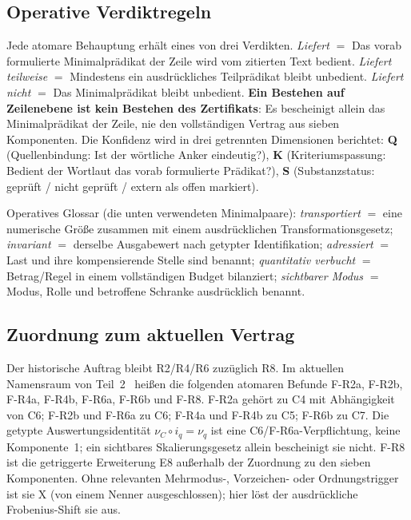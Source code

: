 \documentclass[11pt,a4paper]{article}
\begin{document}
\subsection{Operative Verdiktregeln}\label{sec:rules}

Jede atomare Behauptung erhält eines von drei Verdikten. \emph{Liefert} $=$ Das
vorab formulierte Minimalprädikat der Zeile wird vom zitierten Text bedient.
\emph{Liefert teilweise} $=$ Mindestens ein ausdrückliches Teilprädikat bleibt
unbedient. \emph{Liefert nicht} $=$ Das Minimalprädikat bleibt unbedient.
\textbf{Ein Bestehen auf Zeilenebene ist kein Bestehen des Zertifikats}: Es
bescheinigt allein das Minimalprädikat der Zeile, nie den vollständigen Vertrag
aus sieben Komponenten. Die Konfidenz wird in drei getrennten Dimensionen
berichtet: \textbf{Q} (Quellenbindung: Ist der wörtliche Anker eindeutig?),
\textbf{K} (Kriteriumspassung: Bedient der Wortlaut das vorab formulierte
Prädikat?), \textbf{S} (Substanzstatus: geprüft / nicht geprüft / extern als
offen markiert).

Operatives Glossar (die unten verwendeten Minimalpaare):
\emph{transportiert} $=$ eine numerische Größe zusammen mit einem
ausdrücklichen Transformationsgesetz; \emph{invariant} $=$ derselbe Ausgabewert
nach getypter Identifikation; \emph{adressiert} $=$ Last und ihre
kompensierende Stelle sind benannt; \emph{quantitativ verbucht} $=$
Betrag/Regel in einem vollständigen Budget bilanziert; \emph{sichtbarer Modus}
$=$ Modus, Rolle und betroffene Schranke ausdrücklich benannt.

\subsection{Zuordnung zum aktuellen Vertrag}\label{sec:crosswalk}

Der historische Auftrag bleibt R2/R4/R6 zuzüglich R8. Im aktuellen
Namensraum von Teil~2~\cite{part2} heißen die folgenden atomaren
Befunde F-R2a, F-R2b, F-R4a, F-R4b, F-R6a, F-R6b und F-R8.
F-R2a gehört zu C4 mit Abhängigkeit von C6; F-R2b und F-R6a zu C6;
F-R4a und F-R4b zu C5; F-R6b zu C7. Die getypte Auswertungsidentität
$\nu_C\circ i_q=\nu_q$ ist eine C6/F-R6a-Verpflichtung, keine
Komponente~1; ein sichtbares Skalierungsgesetz allein bescheinigt sie
nicht. F-R8 ist die getriggerte Erweiterung E8 außerhalb der
Zuordnung zu den sieben Komponenten. Ohne relevanten Mehrmodus-,
Vorzeichen- oder Ordnungstrigger ist sie X (von einem Nenner
ausgeschlossen); hier löst der ausdrückliche Frobenius-Shift sie aus.
\end{document}
